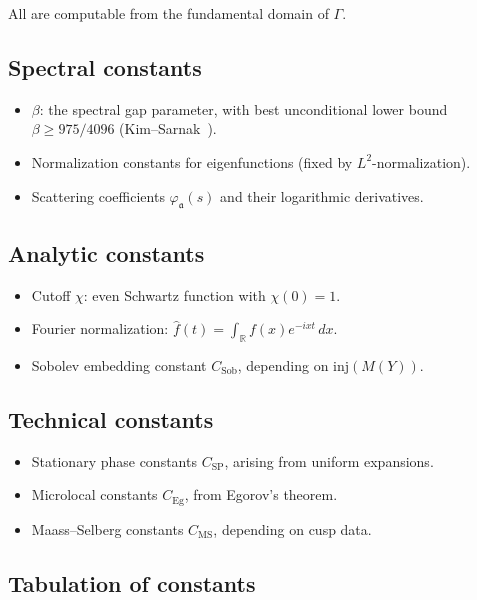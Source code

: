 All are computable from the fundamental domain of $\Gamma$.

\subsection{Spectral constants} \label{subsec:7.6-spectral}

\begin{itemize}
  \item $\beta$: the spectral gap parameter, with best unconditional lower bound
  $\beta \geq 975/4096$ (Kim–Sarnak~\cite{KimSarnak2003}).
  \item Normalization constants for eigenfunctions (fixed by $L^2$-normalization).
  \item Scattering coefficients $\varphi_\mathfrak{a}(s)$ and their logarithmic derivatives.
\end{itemize}

\subsection{Analytic constants} \label{subsec:7.6-analytic}

\begin{itemize}
  \item Cutoff $\chi$: even Schwartz function with $\chi(0)=1$.
  \item Fourier normalization: $\widehat{f}(t)=\int_\mathbb{R} f(x)e^{-ixt}\,dx$.
  \item Sobolev embedding constant $C_{\mathrm{Sob}}$, depending on $\mathrm{inj}(M(Y))$.
\end{itemize}

\subsection{Technical constants} \label{subsec:7.6-technical}

\begin{itemize}
  \item Stationary phase constants $C_{\mathrm{SP}}$, arising from uniform expansions.
  \item Microlocal constants $C_{\mathrm{Eg}}$, from Egorov’s theorem.
  \item Maass–Selberg constants $C_{\mathrm{MS}}$, depending on cusp data.
\end{itemize}

\subsection{Tabulation of constants} \label{subsec:7.6-tab}

